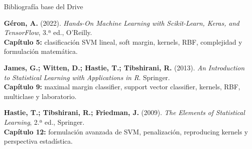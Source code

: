 \begin{frame}{Bibliografía base del Drive}
\footnotesize
\begin{ccdebox}
\textbf{Géron, A.} (2022). \emph{Hands-On Machine Learning with Scikit-Learn, Keras, and TensorFlow}, 3.ª ed., O'Reilly.\\
\textbf{Capítulo 5:} clasificación SVM lineal, soft margin, kernels, RBF, complejidad y formulación matemática.
\end{ccdebox}
\vspace{0.07cm}
\begin{ccdebox}
\textbf{James, G.; Witten, D.; Hastie, T.; Tibshirani, R.} (2013). \emph{An Introduction to Statistical Learning with Applications in R}. Springer.\\
\textbf{Capítulo 9:} maximal margin classifier, support vector classifier, kernels, RBF, multiclase y laboratorio.
\end{ccdebox}
\vspace{0.07cm}
\begin{ccdebox}
\textbf{Hastie, T.; Tibshirani, R.; Friedman, J.} (2009). \emph{The Elements of Statistical Learning}, 2.ª ed., Springer.\\
\textbf{Capítulo 12:} formulación avanzada de SVM, penalización, reproducing kernels y perspectiva estadística.
\end{ccdebox}
\end{frame}

